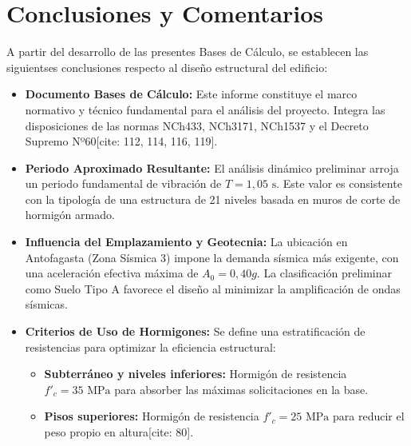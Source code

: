 \section{Conclusiones y Comentarios}

A partir del desarrollo de las presentes Bases de Cálculo, se establecen las siguientses conclusiones respecto al diseño estructural del edificio:

\begin{itemize}
    \item \textbf{Documento Bases de Cálculo:} Este informe constituye el marco normativo y técnico fundamental para el análisis del proyecto. Integra las disposiciones de las normas NCh433, NCh3171, NCh1537 y el Decreto Supremo Nº60[cite: 112, 114, 116, 119].
    
    \item \textbf{Periodo Aproximado Resultante:} El análisis dinámico preliminar arroja un periodo fundamental de vibración de $T = 1,05\text{ s}$. Este valor es consistente con la tipología de una estructura de 21 niveles basada en muros de corte de hormigón armado.
    
    \item \textbf{Influencia del Emplazamiento y Geotecnia:} La ubicación en Antofagasta (Zona Sísmica 3) impone la demanda sísmica más exigente, con una aceleración efectiva máxima de $A_{0} = 0,40g$. La clasificación preliminar como Suelo Tipo A favorece el diseño al minimizar la amplificación de ondas sísmicas.
    
    \item \textbf{Criterios de Uso de Hormigones:} Se define una estratificación de resistencias para optimizar la eficiencia estructural:
    \begin{itemize}
        \item \textbf{Subterráneo y niveles inferiores:} Hormigón de resistencia $f'_{c} = 35\text{ MPa}$ para absorber las máximas solicitaciones en la base.
        \item \textbf{Pisos superiores:} Hormigón de resistencia $f'_{c} = 25\text{ MPa}$ para reducir el peso propio en altura[cite: 80].
    \end{itemize}
\end{itemize}